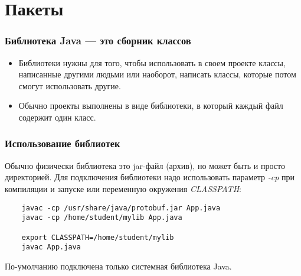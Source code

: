 \section{Пакеты}

\begin{frame}[fragile]
	\frametitle{Библиотека Java — это сборник классов}

	\begin{Large}
	\begin{itemize}
	\item{Библиотеки нужны для того, чтобы использовать в своем проекте классы, написанные другими людьми или наоборот, написать классы, которые потом смогут использовать другие.}
	\item{Обычно проекты выполнены в виде библиотеки, в который каждый файл содержит один класс.}
	\end{itemize}
	\end{Large}
\end{frame}

\begin{frame}[fragile]
	\frametitle{Использование библиотек}

	\begin{large}
	Обычно физически библиотека это jar-файл (архив), но может быть и просто директорией. Для подключения библиотеки надо использовать параметр \emph{-cp} при компиляции и запуске или переменную окружения \emph{CLASSPATH}:
	\medskip

	\begin{verbatim}
	javac -cp /usr/share/java/protobuf.jar App.java
	javac -cp /home/student/mylib App.java
	
	export CLASSPATH=/home/student/mylib
	javac App.java
	\end{verbatim}
	\end{large}

	По-умолчанию подключена только системная библиотека Java.
\end{frame}

